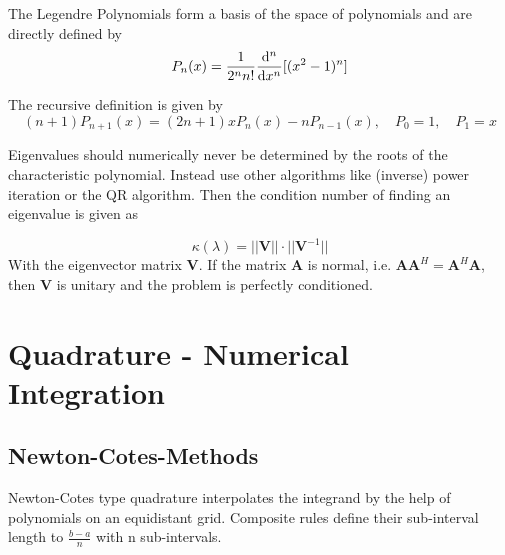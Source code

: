 \documentclass[
    a4paper,
    11pt
]{article}
\begin{document}
\hrulefill

The Legendre Polynomials form a basis of the space of polynomials and are
directly defined by
\begin{equation}
    P_n(x) = \frac{1}{2^n n!} \dv[n]{}{x}[(x^2 - 1)^n]
\end{equation}

The recursive definition is given by
\begin{equation}
    (n+1)P_{n+1}(x) = (2n+1)xP_n(x) - n P_{n-1}(x), \quad P_0 = 1, \quad P_1=x
\end{equation}

\hrulefill

Eigenvalues should numerically never be determined by the roots of the
characteristic polynomial. Instead use other algorithms like (inverse) power
iteration or the QR algorithm. Then the condition number of finding an
eigenvalue is given as

\begin{equation}
    \kappa(\lambda) = ||\mathbf{V}||\cdot||\mathbf{V}^{-1}||
\end{equation}
With the eigenvector matrix $\mathbf{V}$. If the matrix $\mathbf{A}$ is normal,
i.e. $\mathbf{AA}^H = \mathbf{A}^H \mathbf{A}$, then $\mathbf{V}$ is unitary and
the problem is perfectly conditioned.

\section{Quadrature - Numerical Integration}

\subsection{Newton-Cotes-Methods}

Newton-Cotes type quadrature interpolates the integrand by the help of
polynomials on an equidistant grid. Composite rules define their sub-interval
length to $\frac{b-a}{n}$ with n sub-intervals.
\end{document}
